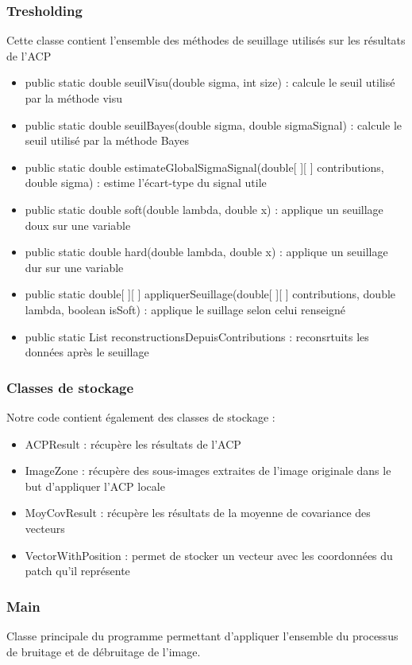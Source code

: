 \subsubsection{Tresholding}
Cette classe contient l'ensemble des méthodes de seuillage utilisés sur les résultats de l'ACP
\begin{itemize}
    \item public static double seuilVisu(double sigma, int size) : calcule le seuil utilisé par la méthode visu
    \item public static double seuilBayes(double sigma, double sigmaSignal) : calcule le seuil utilisé par la méthode Bayes
    \item public static double estimateGlobalSigmaSignal(double[ ][ ] contributions, double sigma) : estime l'écart-type du signal utile
    \item public static double soft(double lambda, double x) : applique un seuillage doux sur une variable
    \item public static double hard(double lambda, double x) : applique un seuillage dur sur une variable
    \item public static double[ ][ ] appliquerSeuillage(double[ ][ ] contributions, double lambda, boolean isSoft) : applique le suillage selon celui renseigné
    \item public static List reconstructionsDepuisContributions : reconsrtuits les données après le seuillage
\end{itemize}

\subsubsection{Classes de stockage}
Notre code contient également des classes de stockage :
\begin{itemize}
    \item ACPResult : récupère les résultats de l'ACP
    \item ImageZone : récupère des sous-images extraites de l'image originale dans le but d'appliquer l'ACP locale
    \item MoyCovResult : récupère les résultats de la moyenne de covariance des vecteurs
    \item VectorWithPosition : permet de stocker un vecteur avec les coordonnées du patch qu'il représente
\end{itemize}

\subsubsection{Main}
Classe principale du programme permettant d'appliquer l'ensemble du processus de bruitage et de débruitage de l'image.

